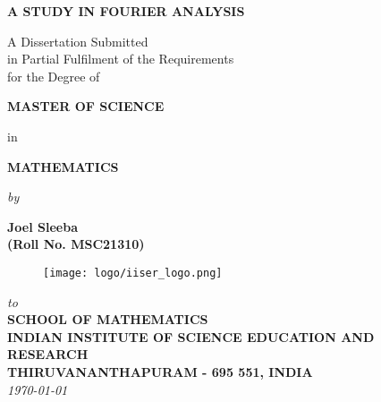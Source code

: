 \begin{titlepage}

\begin{center}

  \vfill

  \textbf{\Large A STUDY IN FOURIER ANALYSIS}\\[10pt]

  \vfill

  A Dissertation Submitted \\
  in Partial Fulfilment of the Requirements  \\
  for the Degree of  \\

  \vfill

  {\Large \bf MASTER OF SCIENCE }

  \vfill

  in

  \vfill

  {\large \bf MATHEMATICS }

  \vfill

  {\em  by} 

  \vfill

  {\large \bf Joel Sleeba} \\[0.3em] %
  {\large \bf (Roll No. MSC21310)}\\[2em]

  \vfill

  \begin{figure}[h]
    \begin{center}
      \texttt{[image: logo/iiser\_logo.png]}
    \end{center}
  \end{figure}

  \vfill

  {\em\large to }\\[1em]
  {\bf\large SCHOOL OF MATHEMATICS} \\%
  {\bf\large INDIAN INSTITUTE OF SCIENCE EDUCATION AND RESEARCH}\\%
  {\bf\large THIRUVANANTHAPURAM - 695 551, INDIA}\\[1em]
  {\it\large \today }

\end{center}
\end{titlepage}

\clearpage


